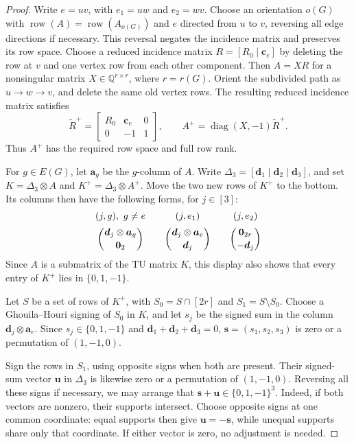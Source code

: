 \documentclass[12pt,a4paper]{article}
\numberwithin{equation}{section}
\DeclareMathOperator{\row}{row}
\newcommand{\QQ}{\mathbb Q}
\theoremstyle{definition}
\theoremstyle{remark}
\begin{document}
\begin{proof}
Write \(e=uv\), with \(e_1=uw\) and \(e_2=wv\).  Choose an
orientation \(o(G)\) with \(\row(A)=\row(A_{o(G)})\) and \(e\)
directed from \(u\) to \(v\), reversing all edge directions if
necessary.  This reversal negates the incidence matrix and preserves
its row space.  Choose a reduced incidence matrix
\(R=[R_0\mid\boldsymbol c_e]\) by deleting the row at \(v\)
and one vertex row from each other component.  Then \(A=XR\)
for a nonsingular matrix \(X\in\QQ^{r\times r}\), where
\(r=r(G)\).  Orient the subdivided path as \(u\to w\to v\),
and delete the same old vertex rows.  The resulting reduced
incidence matrix satisfies
\[
 \widetilde R^+=
 \begin{bmatrix}
  R_0&\boldsymbol c_e&0\\
  0&-1&1
 \end{bmatrix},
 \qquad
 A^+=\operatorname{diag}(X,-1)\widetilde R^+.
\]
Thus \(A^+\) has the required row space and full row rank.

For \(g\in E(G)\), let \(\boldsymbol a_g\) be the \(g\)-column of
\(A\).  Write \(\Delta_3=[\boldsymbol d_1\mid\boldsymbol d_2\mid\boldsymbol d_3]\),
and set \(K=\Delta_3\otimes A\) and
\(K^+=\Delta_3\otimes A^+\).  Move the two new rows of \(K^+\)
to the bottom.  Its columns then have the following forms, for
\(j\in[3]\):
\begin{equation}\label{eq:subdivision-tensor-block-matrix}
 \begin{array}{c@{\qquad}c@{\qquad}c}
  (j,g),\ g\ne e &(j,e_1)&(j,e_2)\\[2mm]
  \displaystyle\binom{\boldsymbol d_j\otimes\boldsymbol a_g}{\boldsymbol 0_2}
  &\displaystyle\binom{\boldsymbol d_j\otimes\boldsymbol a_e}{\boldsymbol d_j}
  &\displaystyle\binom{\boldsymbol 0_{2r}}{-\boldsymbol d_j}
 \end{array}
\end{equation}
Since \(A\) is a submatrix of the TU matrix \(K\), this display
also shows that every entry of \(K^+\) lies in \(\{0,1,-1\}\).

Let \(S\) be a set of rows of \(K^+\), with
\(S_0=S\cap[2r]\) and \(S_1=S\setminus S_0\).
Choose a Ghouila--Houri signing of \(S_0\) in \(K\), and let
\(s_j\) be the signed sum in the column
\(\boldsymbol d_j\otimes\boldsymbol a_e\).
Since \(s_j\in\{0,1,-1\}\) and
\(\boldsymbol d_1+\boldsymbol d_2+\boldsymbol d_3=0\),
\(\boldsymbol s=(s_1,s_2,s_3)\) is zero or a permutation of
\((1,-1,0)\).

Sign the rows in \(S_1\), using opposite signs when both are
present.  Their signed-sum vector \(\boldsymbol u\) in
\(\Delta_3\) is likewise zero or a permutation of \((1,-1,0)\).
Reversing all these signs if necessary, we may arrange that
\(\boldsymbol s+\boldsymbol u\in\{0,1,-1\}^3\).
Indeed, if both vectors are nonzero, their supports intersect.
Choose opposite signs at one common coordinate: equal supports
then give \(\boldsymbol u=-\boldsymbol s\), while unequal
supports share only that coordinate.  If either vector is zero,
no adjustment is needed.


\end{proof}
\end{document}
